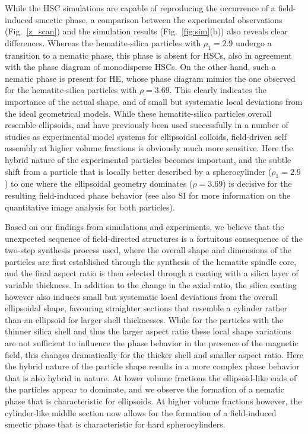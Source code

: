 \documentclass[aps,prl,preprint,superscriptaddress,showkeys]{revtex4-2} %
\begin{document}
While the HSC simulations are capable of reproducing the occurrence of a field-induced smectic phase, a comparison between the experimental observations (Fig.~\ref{z_scan}) and the simulation results (Fig.~\ref{fig:sim}(b)) also reveals clear differences. Whereas the hematite-silica particles with $\rho_1=2.9$ undergo a transition to a nematic phase, this phase is absent for HSCs, also in agreement with the phase diagram of monodisperse HSCs. On the other hand, such a nematic phase is present for HE, whose phase diagram mimics the one observed for the hematite-silica particles with $\rho=3.69$. This clearly indicates the importance of the actual shape, and of small but systematic local deviations from the ideal geometrical models. While these hematite-silica particles overall resemble ellipsoids, and have previously been used successfully in a number of studies as experimental model systems for ellipsoidal colloids, field-driven self assembly at higher volume fractions is obviously much more sensitive. Here the hybrid nature of the experimental particles becomes important, and the subtle shift from a particle that is locally better described by a spherocylinder ($\rho_1=2.9$) to one where the ellipsoidal geometry dominates ($ \rho=3.69$) is decisive for the resulting field-induced phase behavior (see also SI for more information on the quantitative image analysis for both particles).\par
Based on our findings from simulations and experiments, we believe that the unexpected sequence of field-directed structures is a fortuitous consequence of the two-step synthesis process used, where the overall shape and dimensions of the particles are first established through the synthesis of the hematite spindle core, and the final aspect ratio is then selected through a coating with a silica layer of variable thickness. In addition to the change in the axial ratio, the silica coating however also induces small but systematic local deviations from the overall ellipsoidal shape, favouring straighter sections that resemble a cylinder rather than an ellipsoid for larger shell thicknesses. While for the particles with the thinner silica shell and thus the larger aspect ratio these local shape variations are not sufficient to influence the phase behavior in the presence of the magnetic field, this changes dramatically for the thicker shell and smaller aspect ratio. Here the hybrid nature of the particle shape results in a more complex phase behavior that is also hybrid in nature. At lower volume fractions the ellipsoid-like ends of the particles appear to dominate, and we observe the formation of a nematic phase that is characteristic for ellipsoids. At higher volume fractions however, the cylinder-like middle section now allows for the formation of a field-induced smectic phase that is characteristic for hard spherocylinders.\par
\end{document}
